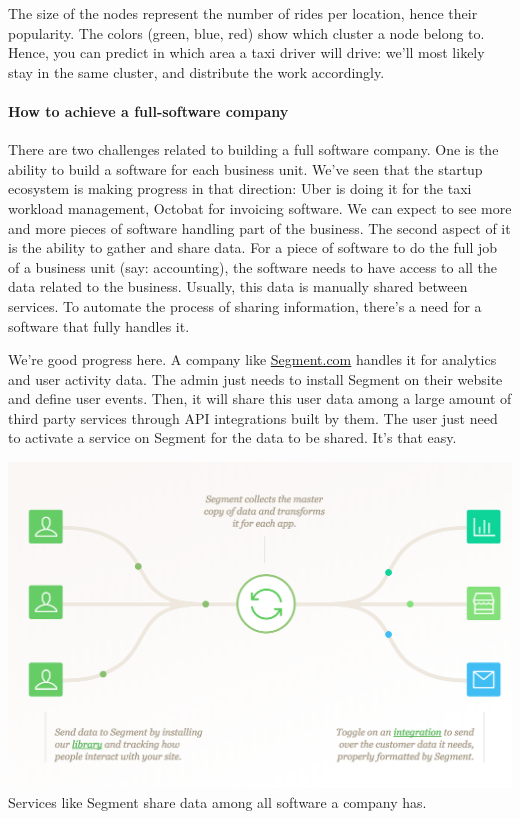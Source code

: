 \documentclass[12pt]{article}
\begin{document}
{The size of the nodes represent the number of rides per location, hence their
popularity.
The colors (green, blue, red) show which cluster a node belong to. Hence, you
can predict in which area a taxi driver will drive: we'll most likely stay in
the same cluster, and distribute the work accordingly.
\smallskip

\paragraph{How to achieve a full-software company}

There are two challenges related to building a full software company.
One is the ability to build a software for each business unit. We've seen that
the startup ecosystem is making progress in that direction: Uber is doing it for
the taxi workload management, Octobat for invoicing software. We can expect to
see more and more pieces of software handling part of the business.
The second aspect of it is the ability to gather and share data. For a piece of
software to do the full job of a business unit (say: accounting), the software
needs to have access to all the data related to the business. Usually, this data
is manually shared between services. To automate the process of sharing
information, there's a need for a software that fully handles it.

We're good progress here. A company like \href{https://segment.com/}{Segment.com}
handles it for analytics and user activity data. The admin just needs to install
Segment on their website and define user events. Then, it will share this user
data among a large amount of third party services through API integrations built
by them. The user just need to activate a service on Segment for the data to be
shared. It's that easy.

\smallskip
\includegraphics[width=\textwidth]{segment}
Services like Segment share data among all software a company has.

}
\end{document}
